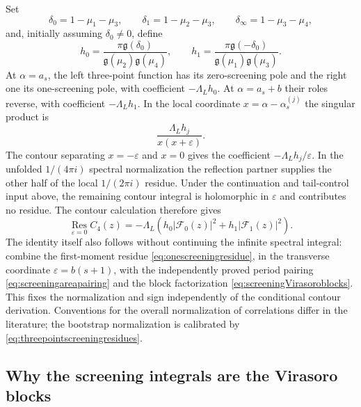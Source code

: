 Set
\begin{equation}
 \delta_0=1-\mu_1-\mu_3,\qquad
 \delta_1=1-\mu_2-\mu_3,\qquad
 \delta_\infty=1-\mu_3-\mu_4,
 \label{eq:screeningexponentdifferences}
\end{equation}
and, initially assuming $\delta_0\ne0$, define
\begin{equation}
 h_0=\frac{\pi\mathfrak g(\delta_0)}
              {\mathfrak g(\mu_2)\mathfrak g(\mu_4)},
 \qquad
 h_1=\frac{\pi\mathfrak g(-\delta_0)}
              {\mathfrak g(\mu_1)\mathfrak g(\mu_3)}.
 \label{eq:screeningHermitiancoefficients}
\end{equation}
At $\alpha=a_s$, the left three-point function has its
zero-screening pole and the right one its one-screening pole,
with coefficient $-\Lambda_Lh_0$. At $\alpha=a_s+b$ their
roles reverse, with coefficient $-\Lambda_Lh_1$.
In the local coordinate $x=\alpha-\alpha_s^{(j)}$ the singular
product is
\[
 \frac{\Lambda_Lh_j}{x(x+\varepsilon)}.
\]
The contour separating $x=-\varepsilon$ and $x=0$ gives the
coefficient $-\Lambda_Lh_j/\varepsilon$. In the unfolded
$1/(4\pi i)$ spectral normalization the reflection partner
supplies the other half of the local $1/(2\pi i)$ residue.
Under the continuation and tail-control input above, the remaining
contour integral is holomorphic in $\varepsilon$ and contributes
no residue. The contour calculation therefore gives
\begin{equation}
 \boxed{\quad
 \operatorname*{Res}_{\varepsilon=0}C_4(z)
  =-\Lambda_L\left(
      h_0|\mathcal F_0(z)|^2+h_1|\mathcal F_1(z)|^2\right).
 \quad}
 \label{eq:spectralonescreeningresidue}
\end{equation}
The identity itself also follows without continuing the infinite
spectral integral: combine the first-moment residue
\eqref{eq:onescreeningresidue}, in the transverse coordinate
$\varepsilon=b(s+1)$, with the independently proved period pairing
\eqref{eq:screeningareapairing} and the block factorization
\eqref{eq:screeningVirasoroblocks}. This fixes the normalization
and sign independently of the conditional contour derivation.
Conventions for the overall normalization of correlations differ
in the literature; the bootstrap normalization is calibrated by
\eqref{eq:threepointscreeningresidues}.

\subsection{Why the screening integrals are the Virasoro blocks}

